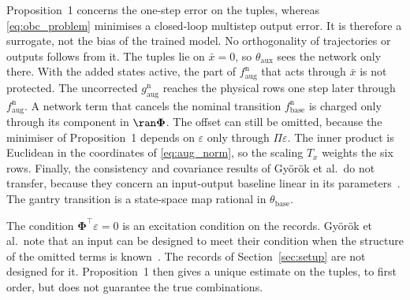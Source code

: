 Proposition~1 concerns the one-step error on the tuples, whereas
\eqref{eq:obc_problem} minimises a closed-loop multistep output error.
It is therefore a surrogate, not the bias of the trained model.
No orthogonality of trajectories or outputs follows from it.
The tuples lie on $\bar x=0$, so $\theta_{\mathrm{aux}}$ sees the network only
there.
With the added states active, the part of $f^{\mathrm n}_{\mathrm{aug}}$ that
acts through $\bar x$ is not protected.
The uncorrected $g^{\mathrm n}_{\mathrm{aug}}$ reaches the physical rows one
step later through $f^{\mathrm n}_{\mathrm{aug}}$.
A network term that cancels the nominal transition
$f^{\mathrm n}_{\mathrm{base}}$ is charged only through its component in
$\ran\boldsymbol\Phi$.
The offset can still be omitted, because the minimiser of Proposition~1
depends on $\varepsilon$ only through $\Pi\varepsilon$.
The inner product is Euclidean in the coordinates of \eqref{eq:aug_norm}, so
the scaling $T_x$ weights the six rows.
Finally, the consistency and covariance results of Gy\"or\"ok et al.\ do not
transfer, because they concern an input-output baseline linear in its
parameters~\cite[Secs.~4.3, 4.4]{gyorok2026obc}.
The gantry transition is a state-space map rational in
$\theta_{\mathrm{base}}$.

The condition $\boldsymbol\Phi^\top\varepsilon=0$ is an excitation condition
on the records.
Gy\"or\"ok et al.\ note that an input can be designed to meet their condition
when the structure of the omitted terms is known~\cite[Remark~5]{gyorok2026obc}.
The records of Section~\ref{sec:setup} are not designed for it.
Proposition~1 then gives a unique estimate on the tuples, to first order, but
does not guarantee the true combinations.
